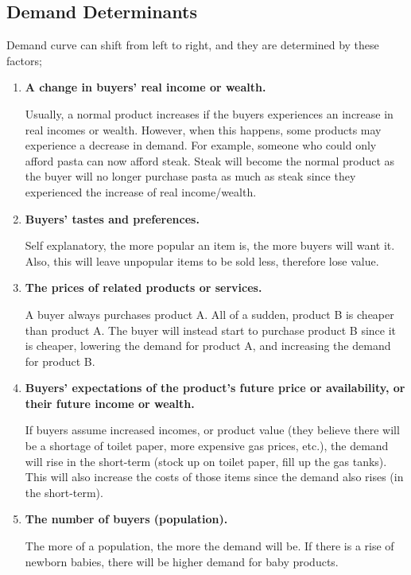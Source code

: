\documentclass[a4paper, 12pt] {article}
\begin{document}
\subsection{Demand Determinants}
Demand curve can shift from left to right, and they are determined by these
factors;
\begin{enumerate}
   \item \textbf{A change in buyers' real income or wealth.}
       
       Usually, a normal product increases if the buyers experiences an increase
       in real incomes or wealth. However, when this happens, some products may
       experience a decrease in demand. For example, someone who could only afford
       pasta can now afford steak. Steak will become the normal product as the 
       buyer will no longer purchase pasta as much as steak since they experienced 
       the increase of real income/wealth.
        
   \item \textbf{Buyers' tastes and preferences.}

       Self explanatory, the more popular an item is, the more buyers will want
       it. Also, this will leave unpopular items to be sold less, therefore lose
       value.

   \item \textbf{The prices of related products or services.}

        A buyer always purchases product A. All of a sudden, product B is cheaper
        than product A. The buyer will instead start to purchase product B since
        it is cheaper, lowering the demand for product A, and increasing the demand
        for product B.

   \item \textbf{Buyers' expectations of the product's future price or
    availability, or their future income or wealth.}

        If buyers assume increased incomes, or product value (they believe there
        will be a shortage of toilet paper, more expensive gas prices, etc.), the
        demand will rise in the short-term (stock up on toilet paper, fill up the
        gas tanks). This will also increase the costs of those items since the
        demand also rises (in the short-term).

    \item \textbf{The number of buyers (population).}

        The more of a population, the more the demand will be. If there is a rise
        of newborn babies, there will be higher demand for baby products.

\end{enumerate}
\end{document}

